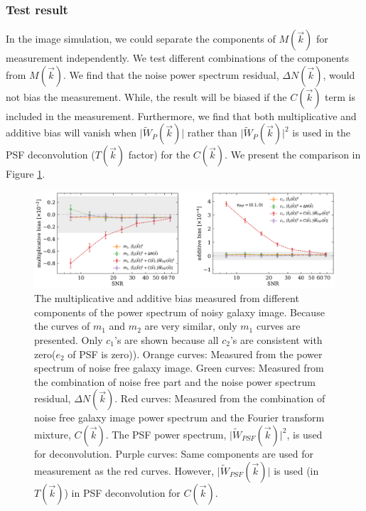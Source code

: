 \documentclass[twocolumn]{aastex62}
\begin{document}
\subsubsection{Test result}

In the image simulation, we could separate the components of $M(\vec{k})$ for measurement independently. We test different combinations of the components from $M(\vec{k})$. We find that the noise power spectrum residual, $\Delta N(\vec{k})$, would not bias the measurement. While, the result will be biased if the $C(\vec{k})$ term is included in the measurement. Furthermore, we find that both multiplicative and additive bias will vanish when $\vert \widetilde{W}_{P}(\vec{k})\vert$ rather than $\vert \widetilde{W}_{P}(\vec{k})\vert^2$ is used in the PSF deconvolution ($T(\vec{k})$ factor) for the $C(\vec{k})$. We present the comparison in Figure \ref{fig:pts_componets}.



\begin{figure}[htbp]
	\centering
	\includegraphics[width=0.9\linewidth]{figures/pts_sample_components.pdf}
	\caption{The multiplicative and additive bias measured from different components of the power spectrum of noisy galaxy image. Because the curves of $m_1$ and $m_2$ are very similar, only $m_1$ curves are presented. Only $c_1$'s are shown because all $c_2$'s are consistent with zero($e_{2}$ of PSF is zero)).  Orange curves: Measured from the power spectrum of noise free galaxy image. Green curves: Measured from the combination of noise free part and the noise power spectrum residual, $\Delta N(\vec{k})$. Red curves: Measured from the combination of noise free galaxy image power spectrum and the Fourier transform mixture, $C(\vec{k})$. The PSF power spectrum, $\vert \widetilde{W}_{PSF}(\vec{k})\vert^2$, is used for deconvolution. Purple curves: Same components are used for measurement as the red curves. However, $\vert \widetilde{W}_{PSF}(\vec{k})\vert$ is used (in $T(\vec{k})$) in PSF deconvolution for $C(\vec{k})$.}\label{fig:pts_componets}
\end{figure}
\end{document}
